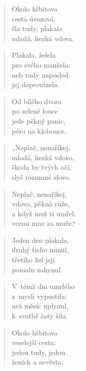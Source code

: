 
\begin{verse}
Okolo hřbitova \\
cesta úvozová; \\
šla tudy, plakala \\
mladá, hezká vdova.
\end{verse}

\begin{verse}
Plakala, želela \\
pro svého manžela: \\
neb tudy naposled \\
jej doprovázela. --
\end{verse}

\begin{verse}
Od bílého dvora \\
po zelené louce \\
jede pěkný panic, \\
péro na klobouce.
\end{verse}

\begin{verse}
„Neplač, nenaříkej, \\
mladá, hezká vdovo, \\
škoda by tvých očí, \\
slyš rozumné slovo.
\end{verse}

\begin{verse}
Neplač, nenaříkej, \\
vdovo, pěkná růže, \\
a když muž ti umřel, \\
vezmi mne za muže.“ --
\end{verse}

\begin{verse}
Jeden den plakala, \\
druhý ticho minul, \\
třetího žel její \\
pomalu zahynul.
\end{verse}

\begin{verse}
V~témž dni umrlého \\
z~mysli vypustila: \\
než měsíc uplynul, \\
k~svatbě šaty šila.
\end{verse}

\begin{verse}
Okolo hřbitova \\
veselejší cesta: \\
jedou tudy, jedou \\
ženich a nevěsta.
\end{verse}

